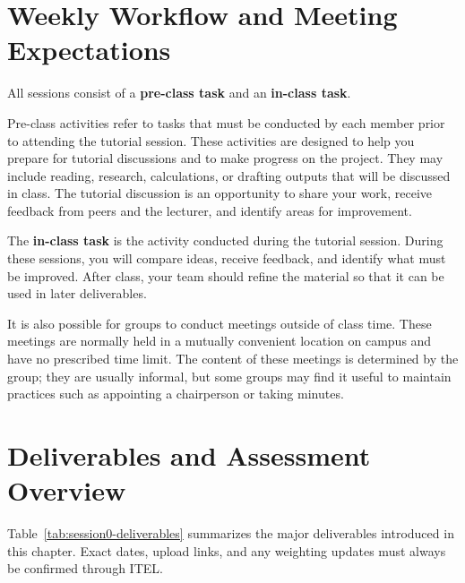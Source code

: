 \section{Weekly Workflow and Meeting Expectations}

All sessions consist of a \textbf{pre-class task} and an \textbf{in-class task}. 

Pre-class activities refer to tasks that must be conducted by each member prior to attending the tutorial session. These activities are designed to help you prepare for tutorial discussions and to make progress on the project. They may include reading, research, calculations, or drafting outputs that will be discussed in class. The tutorial discussion is an opportunity to share your work, receive feedback from peers and the lecturer, and identify areas for improvement. 

The \textbf{in-class task} is the activity conducted during the tutorial session. During these sessions, you will compare ideas, receive feedback, and identify what must be improved. After class, your team should refine the material so that it can be used in later deliverables.

It is also possible for groups to conduct meetings outside of class time. These meetings are normally held in a mutually convenient location on campus and have no prescribed time limit. The content of these meetings is determined by the group; they are usually informal, but some groups may find it useful to maintain practices such as appointing a chairperson or taking minutes.

\section{Deliverables and Assessment Overview}

Table~\ref{tab:session0-deliverables} summarizes the major deliverables introduced in this chapter. Exact dates, upload links, and any weighting updates must always be confirmed through ITEL.

